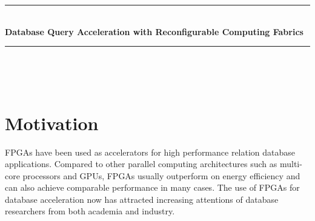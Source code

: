 \documentclass[12pt]{article} %
\begin{document}

\begin{titlepage}

\newcommand{\HRule}{\rule{\linewidth}{0.5mm}} %

\center %

\HRule \\[0.4cm]
{ \huge \bfseries Database Query Acceleration with Reconfigurable Computing Fabrics}\\[0.4cm] %
\HRule \\[1.5cm]

\begin{minipage}{0.4\textwidth}
     \\ 
    \vspace{2em}
    \centering {\large \today}
\end{minipage}

\end{titlepage}




\section{Motivation} %
FPGAs have been used as accelerators for high performance relation database applications. Compared
to other parallel computing architectures such as multi-core processors and GPUs, FPGAs usually
outperform on energy efficiency and can also achieve comparable performance in many cases. The
use of FPGAs for database acceleration now has attracted increasing attentions of database researchers
from both academia and industry. 
\end{document}

